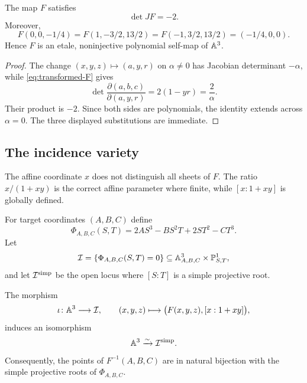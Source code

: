 \begin{proposition}\label{prop:keller}
The map $F$ satisfies
\[
  \det JF=-2.
\]
Moreover,
\[
  F(0,0,-1/4)
  =F(1,-3/2,13/2)
  =F(-1,3/2,13/2)
  =(-1/4,0,0).
\]
Hence $F$ is an etale, noninjective polynomial self-map of $\mathbb A^3$.
\end{proposition}

\begin{proof}
The change $(x,y,z)\mapsto(a,y,r)$ on $\alpha\neq0$ has Jacobian determinant $-\alpha$, while \eqref{eq:transformed-F} gives
\[
  \det\frac{\partial(a,b,c)}{\partial(a,y,r)}
  =2(1-yr)=\frac{2}{\alpha}.
\]
Their product is $-2$.  Since both sides are polynomials, the identity extends across $\alpha=0$.  The three displayed substitutions are immediate.
\end{proof}

\subsection{The incidence variety}

The affine coordinate $x$ does not distinguish all sheets of $F$.  The ratio $x/(1+xy)$ is the correct affine parameter where finite, while $[x:1+xy]$ is globally defined.

\begin{construction}\label{con:incidence-variety}
For target coordinates $(A,B,C)$ define
\begin{equation}\label{eq:binary-cubic}
  \Phi_{A,B,C}(S,T)
  =2AS^3-BS^2T+2ST^2-CT^3.
\end{equation}
Let
\[
  \mathcal I=\{\Phi_{A,B,C}(S,T)=0\}
  \subseteq\mathbb A^3_{A,B,C}\times\mathbb P^1_{S,T},
\]
and let $\mathcal I^{\mathrm{simp}}$ be the open locus where $[S:T]$ is a simple projective root.
\end{construction}

\begin{theorem}\label{thm:incidence-isomorphism}
The morphism
\begin{equation}\label{eq:iota}
  \iota\colon\mathbb A^3\longrightarrow\mathcal I,
  \qquad
  (x,y,z)\longmapsto\bigl(F(x,y,z),[x:1+xy]\bigr),
\end{equation}
induces an isomorphism
\[
  \mathbb A^3\xrightarrow{\sim}\mathcal I^{\mathrm{simp}}.
\]
Consequently, the points of $F^{-1}(A,B,C)$ are in natural bijection with the simple projective roots of $\Phi_{A,B,C}$.
\end{theorem}

